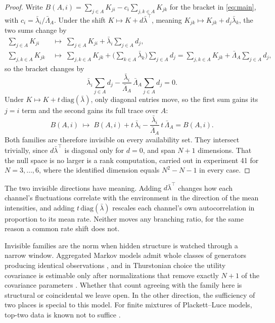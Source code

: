 \documentclass[11pt]{article}
\theoremstyle{remark}
\newcommand{\lbar}{\bar{\lambda}}
\begin{document}
\begin{proof}
Write $B(A,i) = \sum_{j \in A} K_{ji} - c_i \sum_{j,k \in A} K_{jk}$ for the
bracket in \eqref{eq:main}, with $c_i = \lbar_i / \bar\Lambda_A$. Under the
shift $K \mapsto K + d\lbar^\top$, meaning $K_{jk} \mapsto K_{jk} + d_j
\lbar_k$, the two sums change by
\begin{align*}
  \sum_{j\in A} K_{ji}
  &\;\longmapsto\; \sum_{j\in A} K_{ji}
    + \lbar_i \sum_{j\in A} d_j ,\\
  \sum_{j,k\in A} K_{jk}
  &\;\longmapsto\; \sum_{j,k\in A} K_{jk}
    + \Big(\sum_{k\in A}\lbar_k\Big) \sum_{j\in A} d_j
  = \sum_{j,k\in A} K_{jk}
    + \bar\Lambda_A \sum_{j\in A} d_j ,
\end{align*}
so the bracket changes by
\[
  \lbar_i \sum_{j\in A} d_j
  - \frac{\lbar_i}{\bar\Lambda_A}\,\bar\Lambda_A \sum_{j\in A} d_j
  = 0 .
\]
Under $K \mapsto K + t\,\mathrm{diag}(\lbar)$, only diagonal entries move,
so the first sum gains its $j = i$ term and the second gains its full trace
over $A$:
\[
  B(A,i) \;\longmapsto\; B(A,i)
  + t\,\lbar_i - \frac{\lbar_i}{\bar\Lambda_A}\, t\,\bar\Lambda_A
  = B(A,i) .
\]
Both families are therefore invisible on every availability set. They
intersect trivially, since $d\lbar^\top$ is diagonal only for $d = 0$, and
span $N + 1$ dimensions. That the null space is no larger is a rank
computation, carried out in experiment 41 for $N = 3, \dots, 6$, where the
identified dimension equals $N^2 - N - 1$ in every case.
\end{proof}

The two invisible directions have meaning. Adding $d\lbar^\top$ changes how each
channel's fluctuations correlate with the environment in the direction of the
mean intensities, and adding $t\,\mathrm{diag}(\lbar)$ rescales each channel's
own autocorrelation in proportion to its mean rate. Neither moves any branching
ratio, for the same reason a common rate shift does not.

Invisible families are the norm when hidden structure is watched through a
narrow window. Aggregated Markov models admit whole classes of generators
producing identical observations \citep{kienker1989}, and in Thurstonian
choice the utility covariance is estimable only after normalizations that
remove exactly $N+1$ of the covariance parameters
\citep{dansie1985,bunch1991}. Whether that
count agreeing with the family here is structural or coincidental we leave
open. In the other direction, the sufficiency of two places is special to this
model. For finite mixtures of Plackett--Luce models, top-two data is known not
to suffice \citep{zhao2019}.
\end{document}
